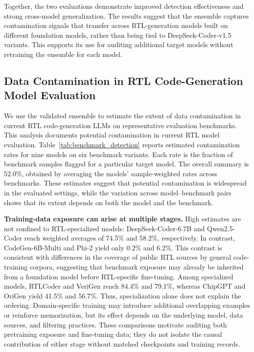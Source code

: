 Together, the two evaluations demonstrate improved detection effectiveness and strong cross-model generalization. The results suggest that the ensemble captures contamination signals that transfer across RTL-generation models built on different foundation models, rather than being tied to DeepSeek-Coder-v1.5 variants. This supports its use for auditing additional target models without retraining the ensemble for each model.

\subsection{Data Contamination in RTL Code-Generation Model Evaluation}
\label{sec:analysis}

We use the validated ensemble to estimate the extent of data contamination in current RTL code-generation LLMs on representative evaluation benchmarks. This analysis documents potential contamination in current RTL model evaluation. Table~\ref{tab:benchmark_detection} reports estimated contamination rates for nine models on six benchmark variants. Each rate is the fraction of benchmark samples flagged for a particular target model. The overall summary is 52.0\%, obtained by averaging the models' sample-weighted rates across benchmarks. These estimates suggest that potential contamination is widespread in the evaluated settings, while the variation across model--benchmark pairs shows that its extent depends on both the model and the benchmark.

\textbf{Training-data exposure can arise at multiple stages.}
High estimates are not confined to RTL-specialized models: DeepSeek-Coder-6.7B and Qwen2.5-Coder reach weighted averages of 74.5\% and 58.2\%, respectively. In contrast, CodeGen-6B-Multi and Phi-2 yield only 0.2\% and 6.2\%. This contrast is consistent with differences in the coverage of public RTL sources by general code-training corpora, suggesting that benchmark exposure may already be inherited from a foundation model before RTL-specific fine-tuning. Among specialized models, RTLCoder and VeriGen reach 84.4\% and 79.1\%, whereas ChipGPT and OriGen yield 41.5\% and 56.7\%. Thus, specialization alone does not explain the ordering. Domain-specific training may introduce additional overlapping examples or reinforce memorization, but its effect depends on the underlying model, data sources, and filtering practices. These comparisons motivate auditing both pretraining exposure and fine-tuning data; they do not isolate the causal contribution of either stage without matched checkpoints and training records.

